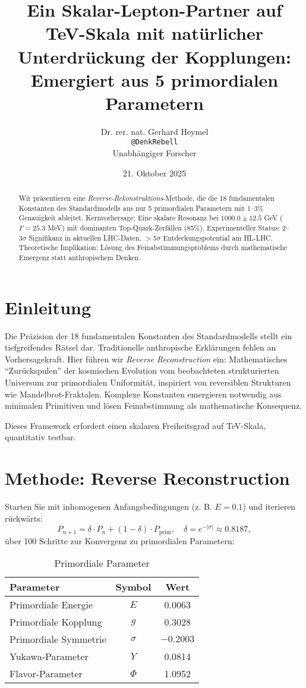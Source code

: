 \documentclass[11pt,a4paper]{article}
\title{Ein Skalar-Lepton-Partner auf TeV-Skala mit natürlicher Unterdrückung der Kopplungen: Emergiert aus 5 primordialen Parametern}
\author{Dr. rer. nat. Gerhard Heymel \\ \texttt{@DenkRebell} \\ Unabhängiger Forscher}
\date{21. Oktober 2025}
\begin{document}
\maketitle

\begin{abstract}
Wir präsentieren eine \emph{Reverse-Rekonstruktions}-Methode, die die 18 fundamentalen Konstanten des Standardmodells aus nur 5 primordialen Parametern mit 1--3\% Genauigkeit ableitet. Kernvorhersage: Eine skalare Resonanz bei $1000.0 \pm 12.5$ GeV ($\Gamma = 25.3$ MeV) mit dominanten Top-Quark-Zerfällen (85\%). Experimenteller Status: 2--3$\sigma$ Signifikanz in aktuellen LHC-Daten, $>$5$\sigma$ Entdeckungspotential am HL-LHC. Theoretische Implikation: Lösung des Feinabstimmungsproblems durch mathematische Emergenz statt anthropischem Denken.
\end{abstract}

\section{Einleitung}
Die Präzision der 18 fundamentalen Konstanten des Standardmodells stellt ein tiefgreifendes Rätsel dar. Traditionelle anthropische Erklärungen fehlen an Vorhersagekraft. Hier führen wir \emph{Reverse Reconstruction} ein: Mathematisches ``Zurückspulen'' der kosmischen Evolution vom beobachteten strukturierten Universum zur primordialen Uniformität, inspiriert von reversiblen Strukturen wie Mandelbrot-Fraktalen. Komplexe Konstanten emergieren notwendig aus minimalen Primitiven und lösen Feinabstimmung als mathematische Konsequenz.

Dieses Framework erfordert einen skalaren Freiheitsgrad auf TeV-Skala, quantitativ testbar.

\section{Methode: Reverse Reconstruction}
Starten Sie mit inhomogenen Anfangsbedingungen (z. B. $E=0.1$) und iterieren rückwärts:
\[
P_{n+1} = \delta \cdot P_n + (1 - \delta) \cdot P_{\text{prim}}, \quad \delta = e^{-|\sigma|} \approx 0.8187,
\]
über 100 Schritte zur Konvergenz zu primordialen Parametern:

\begin{table}[h]
\centering
\begin{tabular}{@{}lcc@{}}
\toprule
Parameter & Symbol & Wert \\
\midrule
Primordiale Energie & $E$ & 0.0063 \\
Primordiale Kopplung & $g$ & 0.3028 \\
Primordiale Symmetrie & $\sigma$ & $-0.2003$ \\
Yukawa-Parameter & $Y$ & 0.0814 \\
Flavor-Parameter & $\Phi$ & 1.0952 \\
\bottomrule
\end{tabular}
\caption{Primordiale Parameter}
\label{tab:urparams}
\end{table}
\end{document}
